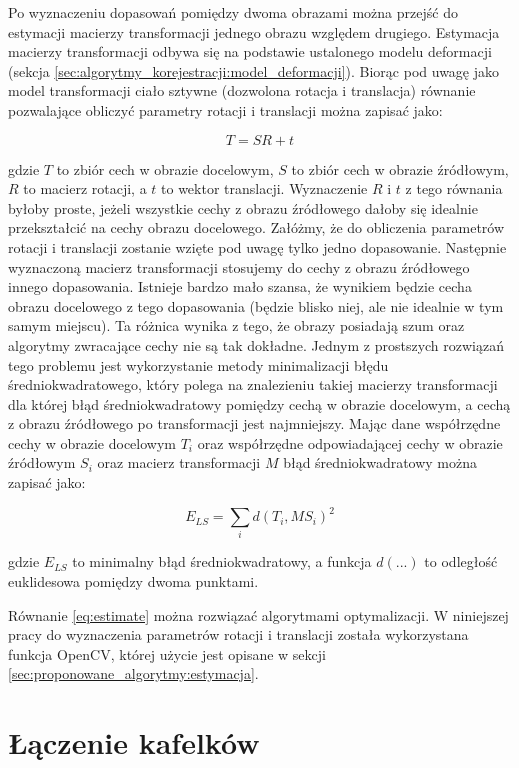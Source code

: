 Po wyznaczeniu dopasowań pomiędzy dwoma obrazami można przejść do estymacji macierzy transformacji jednego obrazu względem drugiego. Estymacja macierzy transformacji odbywa się na podstawie ustalonego modelu deformacji (sekcja \ref{sec:algorytmy_korejestracji:model_deformacji}). Biorąc pod uwagę jako model transformacji ciało sztywne (dozwolona rotacja i translacja) równanie pozwalające obliczyć parametry rotacji i translacji można zapisać jako:

\begin{equation}
T=SR+t
\end{equation}

gdzie $T$ to zbiór cech w obrazie docelowym, $S$ to zbiór cech w obrazie źródłowym, $R$ to macierz rotacji, a $t$ to wektor translacji. Wyznaczenie $R$ i $t$ z tego równania byłoby proste, jeżeli wszystkie cechy z obrazu źródłowego dałoby się idealnie przekształcić na cechy obrazu docelowego. Załóżmy, że do obliczenia parametrów rotacji i translacji zostanie wzięte pod uwagę tylko jedno dopasowanie. Następnie wyznaczoną macierz transformacji stosujemy do cechy z obrazu źródłowego innego dopasowania. Istnieje bardzo mało szansa, że wynikiem będzie cecha obrazu docelowego z tego dopasowania (będzie blisko niej, ale nie idealnie w tym samym miejscu). Ta różnica wynika z tego, że obrazy posiadają szum oraz algorytmy zwracające cechy nie są tak dokładne. Jednym z prostszych rozwiązań tego problemu jest wykorzystanie metody minimalizacji błędu średniokwadratowego, który polega na znalezieniu takiej macierzy transformacji dla której błąd średniokwadratowy pomiędzy cechą w obrazie docelowym, a cechą z obrazu źródłowego po transformacji jest najmniejszy. Mając dane współrzędne cechy w obrazie docelowym $T_{i}$ oraz współrzędne odpowiadającej cechy w obrazie źródłowym $S_{i}$ oraz macierz transformacji $M$ błąd średniokwadratowy można zapisać jako:

\begin{equation}
E_{LS}=\sum_{i}d(T_{i}, MS_{i})^2
\label{eq:estimate}
\end{equation}

gdzie $E_{LS}$ to minimalny błąd średniokwadratowy, a funkcja $d(...)$ to odległość euklidesowa pomiędzy dwoma punktami.

Równanie \ref{eq:estimate} można rozwiązać algorytmami optymalizacji. W niniejszej pracy do wyznaczenia parametrów rotacji i translacji została wykorzystana funkcja OpenCV, której użycie jest opisane w sekcji \ref{sec:proponowane_algorytmy:estymacja}.

\section{Łączenie kafelków}
\label{sec:algorytmy_korejestracji:laczenie_kafelkow}




















